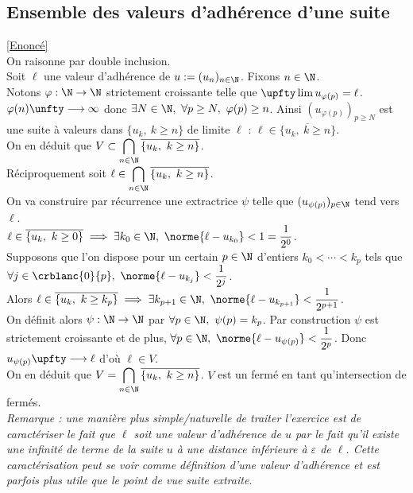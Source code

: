 \documentclass{book}
\begin{document}
	\subsection{Ensemble des valeurs d'adhérence d'une suite }
	\label{sec:ensemble-des-valeurs-dadherence-dune-suite}
	\textcolor{blue}{\hyperref[Ensemble des valeurs d'adhérence d'une suite]{[Enoncé]}}\\
	On raisonne par double inclusion.\\
	Soit $\ell$ une valeur d'adhérence de $u:=(u_n)_{n\in \N}$. Fixons $n\in \N$.\\
	Notons $\varphi:\N\to\N$ strictement croissante telle que $\upfty\lim u_{\varphi(p)}=\ell$. $\varphi(n)\unfty\longrightarrow\infty$ donc $\exists N\in \N,\ \forall p\geq N,\ \varphi(p)\geq n$. Ainsi $(u_{\varphi(p)})_{p\geq N}$ est une suite à valeurs dans $\{u_k,\ k\geq n\}$ de limite $\ell$ : $\ell\in \overline{\{u_k,\ k\geq n\}}$.\\
	On en déduit que $V\subset \displaystyle\bigcap_{n\in \N}\overline{\{u_k,\ k\geq n\}}$.\\
	Réciproquement soit $\ell\in \displaystyle\bigcap_{n\in \N}\overline{\{u_k,\ k\geq n\}}$.\\
	On va construire par récurrence une extractrice $\psi$ telle que $(u_{\psi(p)})_{p\in \N}$ tend vers $\ell$.\\
	$\ell\in \overline{\{u_k,\ k\geq 0\}}\implies \exists k_0\in \N,\ \norme{\ell-u_{k_0}}<1=\dfrac{1}{2^0}$.\\
	Supposons que l'on dispose pour un certain $p\in \N$ d'entiers $k_0<\cdots<k_p$ tels que $\forall j\in \crblanc{0}{p},\ \norme{\ell-u_{k_j}}<\dfrac{1}{2^j}$.\\
	Alors $\ell\in \overline{\{u_k,\ k\geq k_p\}}\implies \exists k_{p+1}\in \N,\ \norme{\ell-u_{k_{p+1}}}<\dfrac{1}{2^{p+1}}$.\\
	On définit alors $\psi:\N\to\N$ par $\forall p\in \N,\ \psi(p)=k_p$. Par construction $\psi$ est strictement croissante et de plus, $\forall p\in \N,\ \norme{\ell-u_{\psi(p)}}<\dfrac{1}{2^p}$. Donc $u_{\psi(p)}\upfty\longrightarrow\ell$ d'où $\ell\in V$.\\
	On en déduit que $V=\displaystyle\bigcap_{n\in \N}\overline{\{u_k,\ k\geq n\}}$. $V$ est un fermé en tant qu'intersection de fermés.\\
	\textit{Remarque : une manière plus simple/naturelle de traiter l'exercice est de caractériser le fait que $\ell$ soit une valeur d'adhérence de $u$ par le fait qu'il existe une infinité de terme de la suite $u$ à une distance inférieure à $\varepsilon$ de $\ell$. Cette caractérisation peut se voir comme définition d'une valeur d'adhérence et est parfois plus utile que le point de vue suite extraite.}
	
\end{document}
